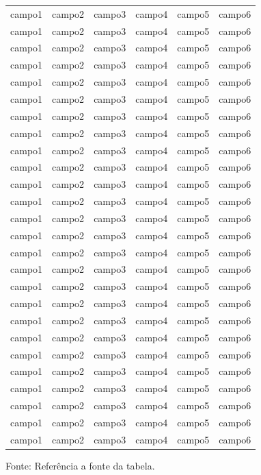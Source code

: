 \begin{longtable}[c]{c|c|c|c|c|c}
	campo1 & campo2 & campo3 & campo4 & campo5 & campo6 \\
	campo1 & campo2 & campo3 & campo4 & campo5 & campo6 \\
	campo1 & campo2 & campo3 & campo4 & campo5 & campo6 \\
	campo1 & campo2 & campo3 & campo4 & campo5 & campo6 \\
	campo1 & campo2 & campo3 & campo4 & campo5 & campo6 \\
	campo1 & campo2 & campo3 & campo4 & campo5 & campo6 \\
	campo1 & campo2 & campo3 & campo4 & campo5 & campo6 \\
	campo1 & campo2 & campo3 & campo4 & campo5 & campo6 \\
	campo1 & campo2 & campo3 & campo4 & campo5 & campo6 \\
	campo1 & campo2 & campo3 & campo4 & campo5 & campo6 \\
	campo1 & campo2 & campo3 & campo4 & campo5 & campo6 \\
	campo1 & campo2 & campo3 & campo4 & campo5 & campo6 \\
	campo1 & campo2 & campo3 & campo4 & campo5 & campo6 \\
	campo1 & campo2 & campo3 & campo4 & campo5 & campo6 \\
	campo1 & campo2 & campo3 & campo4 & campo5 & campo6 \\
	campo1 & campo2 & campo3 & campo4 & campo5 & campo6 \\
	campo1 & campo2 & campo3 & campo4 & campo5 & campo6 \\
	campo1 & campo2 & campo3 & campo4 & campo5 & campo6 \\
	campo1 & campo2 & campo3 & campo4 & campo5 & campo6 \\
	campo1 & campo2 & campo3 & campo4 & campo5 & campo6 \\
	campo1 & campo2 & campo3 & campo4 & campo5 & campo6 \\
	campo1 & campo2 & campo3 & campo4 & campo5 & campo6 \\
	campo1 & campo2 & campo3 & campo4 & campo5 & campo6 \\
	campo1 & campo2 & campo3 & campo4 & campo5 & campo6 \\
	campo1 & campo2 & campo3 & campo4 & campo5 & campo6 \\
	campo1 & campo2 & campo3 & campo4 & campo5 & campo6 \\
\hline
\end{longtable}
\vspace{-8mm}
\begin{center}
	Fonte: Referência a fonte da tabela.
\end{center}


